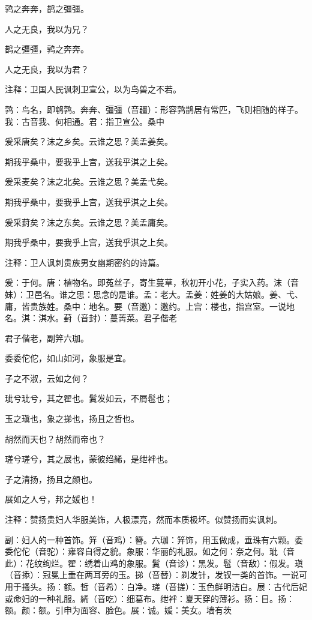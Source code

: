 \documentclass[12pt,UTF8]{ctexbook}
\begin{document}
鹑之奔奔，鹊之彊彊。

人之无良，我以为兄？

鹊之彊彊，鹑之奔奔。

人之无良，我以为君？

注释：卫国人民讽刺卫宣公，以为鸟兽之不若。

鹑：鸟名，即鹌鹑。奔奔、彊彊（音疆）：形容鹑鹊居有常匹，飞则相随的样子。我：古音我、何相通。君：指卫宣公。桑中

爰采唐矣？沫之乡矣。云谁之思？美孟姜矣。

期我乎桑中，要我乎上宫，送我乎淇之上矣。

爰采麦矣？沫之北矣。云谁之思？美孟弋矣。

期我乎桑中，要我乎上宫，送我乎淇之上矣。

爰采葑矣？沫之东矣。云谁之思？美孟庸矣。

期我乎桑中，要我乎上宫，送我乎淇之上矣。

注释：卫人讽刺贵族男女幽期密约的诗篇。

爰：于何。唐：植物名。即菟丝子，寄生蔓草，秋初开小花，子实入药。沫（音妹）：卫邑名。谁之思：思念的是谁。孟：老大。孟姜：姓姜的大姑娘。姜、弋、庸，皆贵族姓。桑中：地名。要（音邀）：邀约。上宫：楼也，指宫室。一说地名。淇：淇水。葑（音封）：蔓菁菜。君子偕老

君子偕老，副笄六珈。

委委佗佗，如山如河，象服是宜。

子之不淑，云如之何？

玼兮玼兮，其之翟也。鬒发如云，不屑髢也；

玉之瑱也，象之挮也，扬且之皙也。

胡然而天也？胡然而帝也？

瑳兮瑳兮，其之展也，蒙彼绉絺，是绁袢也。

子之清扬，扬且之颜也。

展如之人兮，邦之媛也！

注释：赞扬贵妇人华服美饰，人极漂亮，然而本质极坏。似赞扬而实讽刺。

副：妇人的一种首饰。笄（音鸡）：簪。六珈：笄饰，用玉做成，垂珠有六颗。委委佗佗（音驼）：雍容自得之貌。象服：华丽的礼服。如之何：奈之何。玼（音此）：花纹绚烂。翟：绣着山鸡的象服。鬒（音诊）：黑发。髢（音敌）：假发。瑱（音掭）：冠冕上垂在两耳旁的玉。挮（音替）：剃发针，发钗一类的首饰。一说可用于搔头。扬：额。皙（音希）：白净。瑳（音搓）：玉色鲜明洁白。展：古代后妃或命妇的一种礼服。絺（音吃）：细葛布。绁袢：夏天穿的薄衫。扬：目。扬：额。颜：额。引申为面容、脸色。展：诚。媛：美女。墙有茨
\end{document}
